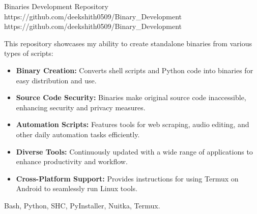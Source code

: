 \documentclass[a4paper,10pt]{article}
\makeatletter
\newcommand{\experienceentry}[5]{%
    \begin{tabularx}{\linewidth}{@{}l r@{}}
        \color{myblue} \textbf{#1} \hfill \color{mydarkblue} #2 \\[4pt]
        \color{mydarkblue} \textit{#3} \hfill \color{mylightpurple} \textit{#4} \\[5pt]
        \begin{minipage}[t]{\linewidth}
            #5
        \end{minipage}
    \end{tabularx}
}
\makeatother
\begin{document}
\projectentry
{Binaries Development Repository}
{https://github.com/deekshith0509/Binary_Development}
{https://github.com/deekshith0509/Binary_Development}
{This repository showcases my ability to create standalone binaries from various types of scripts:
\begin{itemize}
\item \textbf{Binary Creation:} Converts shell scripts and Python code into binaries for easy distribution and use.
\item \textbf{Source Code Security:} Binaries make original source code inaccessible, enhancing security and privacy measures.
\item \textbf{Automation Scripts:} Features tools for web scraping, audio editing, and other daily automation tasks efficiently.
\item \textbf{Diverse Tools:} Continuously updated with a wide range of applications to enhance productivity and workflow.
\item \textbf{Cross-Platform Support:} Provides instructions for using Termux on Android to seamlessly run Linux tools.
\end{itemize}
}{Bash, Python, SHC, PyInstaller, Nuitka, Termux.}

\vspace{8pt}
\fi   %





\newcommand{\experienceentry}[5]{%
    \begin{tabularx}{\linewidth}{@{} X r @{}}
        \color{myblue} \textbf{#1} & \color{mydarkblue} #2 \\
        \color{mydarkblue} \textbf{#3} & \color{mydarkblue} #4 \\
        \begin{minipage}[t]{\linewidth}
            \begin{itemize}[nosep, after=\strut, leftmargin=2em, itemsep=2pt]
                #5
            \end{itemize}
        \end{minipage}
    \end{tabularx}
    \vspace{10pt}
}

\titleformat{\section}{\Large\scshape\color{myblue}\centering}{}{0em}{}[\titlerule]
\titlespacing{\section}{0pt}{2pt}{2pt}
\end{document}
